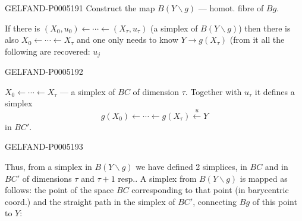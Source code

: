 \begin{GelfandAdjacentEvidence}{GELFAND-P000519}{1}
Construct the map $B(Y\backslash g)$ — homot. fibre of $Bg$.

If there is $(X_0,u_0)\leftarrow\cdots\leftarrow(X_\tau,u_\tau)$
(a simplex of $B(Y\backslash g)$)
then there is also $X_0\leftarrow\cdots\leftarrow X_\tau$
and one only needs to know $Y\to g(X_\tau)$ (from it all the following are recovered: $u_j$
\end{GelfandAdjacentEvidence}
\begin{GelfandAdjacentEvidence}{GELFAND-P000519}{2}


$X_0\leftarrow\cdots\leftarrow X_\tau$ — a simplex of $BC$ of dimension $\tau$.
Together with $u_\tau$ it defines a simplex
\[
g(X_0)\leftarrow\cdots\leftarrow g(X_\tau)\overset{u}{\leftarrow}Y
\]
in $BC'$.
\end{GelfandAdjacentEvidence}
\begin{GelfandAdjacentEvidence}{GELFAND-P000519}{3}


Thus, from a simplex in $B(Y\backslash g)$ we have defined 2 simplices, in $BC$ and in $BC'$
of dimensions $\tau$ and $\tau+1$ resp..
A simplex from $B(Y\backslash g)$ is mapped as follows: the point of the space $BC$
corresponding to that point (in barycentric coord.) and the straight path in the simplex of $BC'$, connecting $Bg$ of this point to $Y$:
\end{GelfandAdjacentEvidence}
